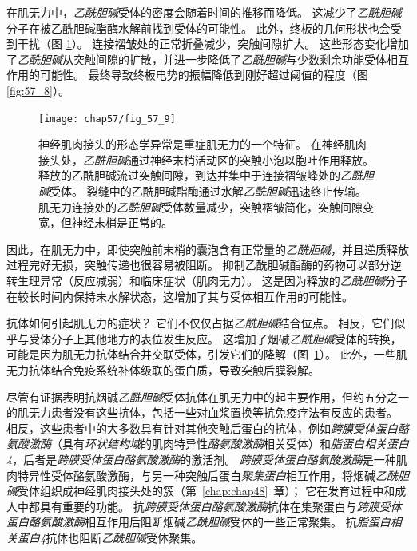 在肌无力中，\textit{乙酰胆碱}受体的密度会随着时间的推移而降低。
这减少了\textit{乙酰胆碱}分子在被乙酰胆碱酯酶水解前找到受体的可能性。
此外，终板的几何形状也会受到干扰（图 \ref{fig:57_9}）。
连接褶皱处的正常折叠减少，突触间隙扩大。
这些形态变化增加了\textit{乙酰胆碱}从突触间隙的扩散，并进一步降低了\textit{乙酰胆碱}与少数剩余功能受体相互作用的可能性。
最终导致终板电势的振幅降低到刚好超过阈值的程度（图 \ref{fig:57_8}）。


\begin{figure}[htbp]
	\centering
	\texttt{[image: chap57/fig\_57\_9]}
	\caption{神经肌肉接头的形态学异常是重症肌无力的一个特征。
		在神经肌肉接头处，\textit{乙酰胆碱}通过神经末梢活动区的突触小泡以胞吐作用释放。
		释放的乙酰胆碱流过突触间隙，到达并集中于连接褶皱峰处的\textit{乙酰胆碱}受体。
		裂缝中的乙酰胆碱酯酶通过水解\textit{乙酰胆碱}迅速终止传输。
		肌无力连接处的\textit{乙酰胆碱}受体数量减少，突触褶皱简化，突触间隙变宽，但神经末梢是正常的。}
	\label{fig:57_9}
\end{figure}


因此，在肌无力中，即使突触前末梢的囊泡含有正常量的\textit{乙酰胆碱}，并且递质释放过程完好无损，突触传递也很容易被阻断。
抑制乙酰胆碱酯酶的药物可以部分逆转生理异常（反应减弱）和临床症状（肌肉无力）。
这是因为释放的\textit{乙酰胆碱}分子在较长时间内保持未水解状态，这增加了其与受体相互作用的可能性。


抗体如何引起肌无力的症状？
它们不仅仅占据\textit{乙酰胆碱}结合位点。
相反，它们似乎与受体分子上其他地方的表位发生反应。
这增加了烟碱\textit{乙酰胆碱}受体的转换，可能是因为肌无力抗体结合并交联受体，引发它们的降解（图~\ref{fig:57_9}）。
此外，一些肌无力抗体结合免疫系统补体级联的蛋白质，导致突触后膜裂解。


尽管有证据表明抗烟碱\textit{乙酰胆碱}受体抗体在肌无力中的起主要作用，但约五分之一的肌无力患者没有这些抗体，包括一些对血浆置换等抗免疫疗法有反应的患者。
相反，这些患者中的大多数具有针对其他突触后蛋白的抗体，例如\textit{跨膜受体蛋白酪氨酸激酶}（具有\textit{环状结构域}的肌肉特异性\textit{酪氨酸激酶}相关受体）和\textit{脂蛋白相关蛋白4}，后者是\textit{跨膜受体蛋白酪氨酸激酶}的激活剂。
\textit{跨膜受体蛋白酪氨酸激酶}是一种肌肉特异性受体酪氨酸激酶，与另一种突触后蛋白\textit{聚集蛋白}相互作用，将烟碱\textit{乙酰胆碱}受体组织成神经肌肉接头处的簇（第~\ref{chap:chap48}~章）；
它在发育过程中和成人中都具有重要的功能。
抗\textit{跨膜受体蛋白酪氨酸激酶}抗体在集聚蛋白与\textit{跨膜受体蛋白酪氨酸激酶}相互作用后阻断烟碱\textit{乙酰胆碱}受体的一些正常聚集。
抗\textit{脂蛋白相关蛋白4}抗体也阻断\textit{乙酰胆碱}受体聚集。



